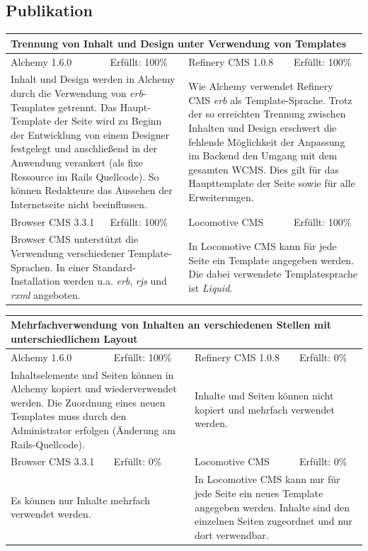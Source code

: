 \subsection{Publikation}
\begin{tabular}[!ht]{|l|l|l|l|}
\hline
\multicolumn{4}{|p{15cm}|}{\textbf{Trennung von Inhalt und Design unter Verwendung von Templates}} \\
\hline
  Alchemy 1.6.0 & \cellcolor{green}Erfüllt: 100\% & Refinery CMS 1.0.8 & \cellcolor{green}Erfüllt: 100\% \\
  \hline
  \multicolumn{2}{|p{7.5cm}|}{Inhalt und Design werden in Alchemy durch die Verwendung von \emph{erb}-Templates getrennt. Das Haupt-Template der Seite wird zu Beginn der Entwicklung von einem Designer festgelegt und anschließend in der Anwendung verankert (als fixe Ressource im Rails Quellcode). So können Redakteure das Aussehen der Internetseite nicht beeinflussen.} & \multicolumn{2}{p{7.5cm}|}{Wie Alchemy verwendet Refinery CMS \emph{erb} als Template-Sprache.
Trotz der so erreichten Trennung zwischen Inhalten und Design erschwert die fehlende Möglichkeit der Anpassung im Backend den Umgang mit dem gesamten WCMS. Dies gilt für das Haupttemplate der Seite sowie für alle Erweiterungen.} \\
  \hline
  Browser CMS 3.3.1 & \cellcolor{green}Erfüllt: 100\% & Locomotive CMS & \cellcolor{green}Erfüllt: 100\% \\
  \hline
  \multicolumn{2}{|p{7.5cm}|}{Browser CMS unterstützt die Verwendung verschiedener Template-Sprachen.
In einer Standard-Installation werden u.a. \emph{erb}, \emph{rjs} und \emph{rxml} angeboten.} & \multicolumn{2}{p{7.5cm}|}{In Locomotive CMS kann für jede Seite ein Template angegeben werden. Die dabei verwendete Templatesprache ist \emph{Liquid}.} \\
\hline
\end{tabular}
\newline
\newline
\newline
\begin{tabular}[!ht]{|l|l|l|l|}
\hline
\multicolumn{4}{|p{15cm}|}{\textbf{Mehrfachverwendung von Inhalten an verschiedenen Stellen mit unterschiedlichem Layout}} \\
\hline
  Alchemy 1.6.0 & \cellcolor{green}Erfüllt: 100\% & Refinery CMS 1.0.8 & \cellcolor{red}Erfüllt: 0\% \\
  \hline
  \multicolumn{2}{|p{7.5cm}|}{Inhaltselemente und Seiten können in Alchemy kopiert und wiederverwendet werden. Die Zuordnung eines neuen Templates muss durch den Administrator erfolgen (Änderung am Rails-Quellcode).} & \multicolumn{2}{p{7.5cm}|}{Inhalte und Seiten können nicht kopiert und mehrfach verwendet werden.} \\
  \hline
  Browser CMS 3.3.1 & \cellcolor{red}Erfüllt: 0\% & Locomotive CMS & \cellcolor{red}Erfüllt: 0\% \\
  \hline
  \multicolumn{2}{|p{7.5cm}|}{Es können nur Inhalte mehrfach verwendet werden.} & \multicolumn{2}{p{7.5cm}|}{In Locomotive CMS kann nur für jede Seite ein neues Template angegeben werden. Inhalte sind den einzelnen Seiten zugeordnet und nur dort verwendbar.} \\
\hline
\end{tabular}

